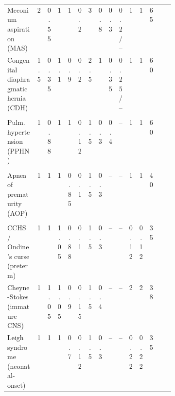 {\begin{longtable}{@{}>{\raggedright\arraybackslash}p{0.27\linewidth}cccccccccccc>{\raggedright\arraybackslash}p{0.13\linewidth}@{}}
Meconium aspiration (MAS) & 2 & 0.55 & 1 & 1 & 0.2 & 3 & 0.8 & 0.3 & 0.2/-- & 1 & 1 & 65 & \citep{wiswell1990}\\
Congenital diaphragmatic hernia (CDH) & 1.5 & 0.35 & 1.1 & 0.9 & 0.2 & 2.5 & 1 & 0.35 & 0.25/-- & 1 & 1 & 60 & \citep{deprest2009}\\
\multicolumn{14}{@{}l}{\textit{Circulation}}\\
Pulm. hypertension (PPHN) & 1 & 0.88 & 1 & 1 & 0.12 & 1.5 & 0.3 & 0.4 & -- & 1 & 1 & 60 & \citep{steinhorn2010}\\
\multicolumn{14}{@{}l}{\textit{Drive}}\\
Apnea of prematurity (AOP) & 1 & 1 & 1 & 0.85 & 0.1 & 1.5 & 0.3 & -- & -- & 1 & 1 & 40 & \citep{martin2011}\\
\multicolumn{14}{@{}l}{\textit{Central hypoventilation}}\\
CCHS / Ondine's curse (preterm) & 1 & 1 & 1.05 & 0.88 & 0.1 & 1.5 & 0.3 & -- & -- & 0.12 & 0.12 & 35 & \citep{weesemayer2010,trang2005}\\
Cheyne-Stokes (immature CNS) & 1 & 1.05 & 1.05 & 0.9 & 0.15 & 1.5 & 0.4 & -- & -- & 2 & 2 & 38 & \citep{bradley2003,naughton1993}\\
Leigh syndrome (neonatal-onset) & 1 & 1 & 1 & 0.7 & 0.12 & 1.5 & 0.3 & -- & -- & 0.22 & 0.22 & 35 & \citep{leigh1951}\\
\end{longtable}}

